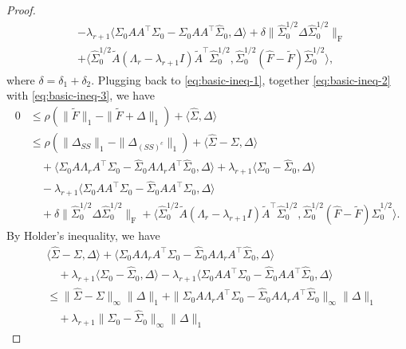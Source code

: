 \documentclass[11pt]{article}
\newcommand{\LambdaRest}{\overline{\Lambda}} %
\newcommand{\so}{\widehat{\Sigma}_0}
\newcommand{\0}{{\mathbf{0}}}
\newcommand{\tA}{{\widetilde{A}}}
\newcommand{\tF}{{\widetilde{F}}}
\begin{document}
\begin{proof}
\begin{align*}
&-\lambda_{r+1}\langle\Sigma_0AA^\top\Sigma_0-\widehat{\Sigma}_0AA^\top\so,\Delta \rangle+\delta\|\so^{1/2}\Delta\so^{1/2}\|_\mathrm{F}\\
&+ \langle \so^{1/2}\tA(\Lambda_r-\lambda_{r+1}I) \tA^\top\so^{1/2},\so^{1/2}(\widehat{F}-\tF)\so^{1/2} \rangle,
\end{align*}
where $\delta = \delta_1+\delta_2$.
Plugging back to \eqref{eq:basic-ineq-1}, together \eqref{eq:basic-ineq-2} with \eqref{eq:basic-ineq-3}, we have 
\begin{equation}
\label{eq:basic-ineq-4}
\begin{aligned}
0& \leq \rho(\|\tF\|_1-\|\tF+\Delta\|_1)+\langle \widehat{\Sigma},\Delta\rangle\\
& \leq  \rho(\|\Delta_{SS}\|_1-\|\Delta_{(SS)^c}\|_1) 
+\langle\widehat{\Sigma}-\Sigma,\Delta\rangle \\
& \quad + \langle\Sigma_0A\Lambda_rA^\top\Sigma_0-\so A\Lambda_r A^\top\so,\Delta\rangle+\lambda_{r+1}\langle \Sigma_0-\widehat{\Sigma}_0,\Delta\rangle \\
&\quad -\lambda_{r+1}\langle\Sigma_0AA^\top\Sigma_0-\widehat{\Sigma}_0AA^\top\so,\Delta \rangle \\
& \quad +\delta\|\so^{1/2}\Delta\so^{1/2}\|_\mathrm{F}+ \langle \so^{1/2}\tA(\Lambda_r-\lambda_{r+1}I) \tA^\top\so^{1/2},\so^{1/2}(\widehat{F}-\tF)\so^{1/2} \rangle.
\end{aligned}
\end{equation}
By Holder's inequality, we have 
\begin{equation}
      \label{eq:Delta-terms}
\begin{aligned}
& \langle\widehat{\Sigma}-\Sigma,\Delta\rangle+\langle\Sigma_0A\Lambda_rA^\top\Sigma_0-\so A\Lambda_r A^\top\so,\Delta\rangle \\
& \quad +\lambda_{r+1}\langle \Sigma_0-\widehat{\Sigma}_0,\Delta\rangle-\lambda_{r+1}\langle\Sigma_0AA^\top\Sigma_0-\widehat{\Sigma}_0AA^\top\so,\Delta \rangle\\
& \leq  \|\widehat{\Sigma}-\Sigma\|_\infty\|\Delta\|_1+\|\Sigma_0A\Lambda_rA^\top\Sigma_0-\so A\Lambda_r A^\top\so\|_\infty\|\Delta\|_1\\
& \quad 
+\lambda_{r+1}\|\Sigma_0-\widehat{\Sigma}_0\|_\infty\|\Delta\|_1

\end{aligned}
\end{equation}
\end{proof}
\end{document}
